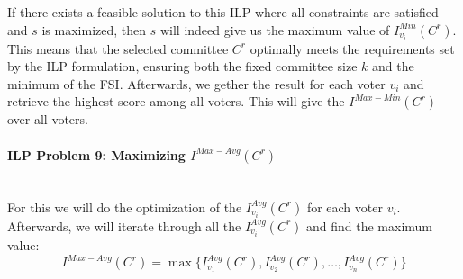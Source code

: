 \documentclass{article}
\begin{document}
\begin{itemize}
If there exists a feasible solution to this ILP where all constraints are satisfied and \(s\) is maximized, then \(s\) will indeed give us the maximum value of  \(I_{v_i}^{Min}(C^{r})\). This means that the selected committee \(C^r\) optimally meets the requirements set by the ILP formulation, ensuring both the fixed committee size \(k\) and the minimum of the FSI. Afterwards, we gether the result for each voter $v_i$ and retrieve the highest score among all voters. This will give the $I^{Max-Min}(C^{r})$ over all voters.
\end{itemize}

\paragraph*{ILP Problem 9: Maximizing  $I^{Max-Avg}(C^{r})$}\mbox{} \\
For this we will do the optimization of the $I_{v_i}^{Avg}(C^{r})$ for each voter $v_i$. Afterwards, we will iterate through all the $I_{v_i}^{Avg}(C^{r})$ and find the maximum value:
  \[I^{Max-Avg}(C^{r}) = \max\{ I_{v_1}^{Avg}(C^{r}), I_{v_2}^{Avg}(C^{r}), \ldots, I_{v_n}^{Avg}(C^{r}) \}\]
\end{document}
